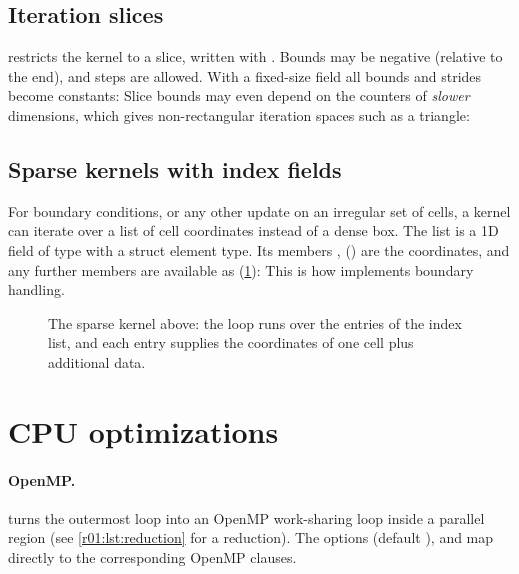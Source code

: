 \subsection{Iteration slices}
 restricts the kernel to a slice, written with
. Bounds may be negative (relative to the end), and steps are
allowed. With a fixed-size field all bounds and strides become constants:
Slice bounds may even depend on the counters of \emph{slower} dimensions, which gives
non-rectangular iteration spaces such as a triangle:

\subsection{Sparse kernels with index fields}\label{r01:sec:sparse}
For boundary conditions, or any other update on an irregular set of cells, a kernel can
iterate over a list of cell coordinates instead of a dense box. The list is a 1D field of
type  with a struct element type. Its members , 
() are the coordinates, and any further members are available as
 (\cref{r01:fig:sparse}):
This is how  implements boundary handling.

\begin{figure}[htbp]
  \centering
  
  \caption[A sparse index-list kernel]{The sparse kernel above: the loop runs over the entries of the index list, and each entry supplies the coordinates of one cell plus additional data.}
  \label{r01:fig:sparse}
\end{figure}


\section{CPU optimizations}\label{r01:sec:cpu-options}

\paragraph{OpenMP.}
 turns the outermost loop into an OpenMP work-sharing
loop inside a parallel region (see \cref{r01:lst:reduction} for a reduction). The options
 (default ),  and  map
directly to the corresponding OpenMP clauses.

